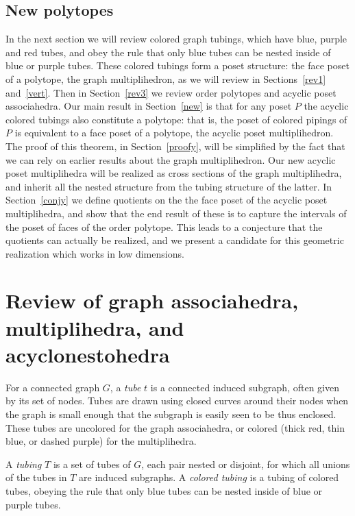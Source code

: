 \documentclass{article}
\begin{document}
\subsection{New polytopes}
In the next section we will review colored graph tubings, which have blue, purple and red tubes, and obey the rule that only blue tubes can be nested inside of blue or purple tubes. These colored tubings form a poset structure: the face poset of a polytope, the graph multiplihedron, as we will review in Sections~\ref{rev1} and~\ref{vert}. Then in Section~\ref{rev3} we review order polytopes and acyclic poset associahedra.
Our main result in Section~\ref{new} is that for any poset $P$ the acyclic colored tubings also constitute a polytope: that is, the poset of colored pipings of $P$ is equivalent to a face poset of a polytope, the acyclic poset multiplihedron.
The proof of this theorem, in Section~\ref{proofy}, will be simplified by the fact that we can rely on earlier results about the graph multiplihedron. Our new acyclic poset multiplihedra will be realized as cross sections of the graph multiplihedra, and inherit all the nested structure from the tubing structure of the latter. In Section~\ref{conjy} we define quotients on the the face poset of the acyclic poset multiplihedra, and show that the end result of these is to capture the intervals of the poset of faces of the order polytope. This leads to a conjecture that the quotients can actually be realized, and we present a candidate for this geometric realization which works in low dimensions.





\section {Review of graph associahedra, multiplihedra, and acyclonestohedra}
\label{rev}


For a connected graph $G$, a \textit{tube} $t$ is a connected induced subgraph, often given by its set of nodes. Tubes are drawn using closed curves around their nodes when the graph is small enough that the subgraph is easily seen to be thus enclosed. These tubes are uncolored for the graph associahedra, or colored (thick red, thin blue, or dashed purple) for the multiplihedra. 

A \textit{tubing} $T$ is a set of tubes of $G$, each pair nested or
disjoint, for which all unions of the tubes in $T$
are induced subgraphs. A \textit{colored tubing} is a tubing of colored tubes, obeying the rule that only blue tubes can be nested inside of blue or purple tubes.
\end{document}
